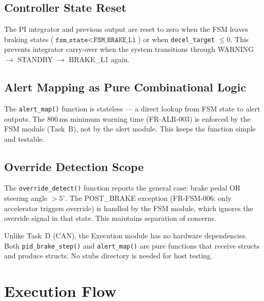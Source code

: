 \documentclass[12pt]{article}
\begin{document}
\subsection{Controller State Reset}

The PI integrator and previous output are reset to zero when the FSM leaves braking states ($\texttt{fsm\_state} < \texttt{FSM\_BRAKE\_L1}$) or when \texttt{decel\_target} $\leq 0$. This prevents integrator carry-over when the system transitions through WARNING $\to$ STANDBY $\to$ BRAKE\_L1 again.

\subsection{Alert Mapping as Pure Combinational Logic}

The \texttt{alert\_map()} function is stateless --- a direct lookup from FSM state to alert outputs. The 800\,ms minimum warning time (FR-ALR-003) is enforced by the FSM module (Task~B), not by the alert module. This keeps the function simple and testable.

\subsection{Override Detection Scope}

The \texttt{override\_detect()} function reports the general case: brake pedal OR steering angle $> 5^{\circ}$. The POST\_BRAKE exception (FR-FSM-006: only accelerator triggers override) is handled by the FSM module, which ignores the override signal in that state. This maintains separation of concerns.

\begin{tcolorbox}[colback=ddbrownlight, colframe=ddbrown, title=\textbf{Design Decision: No HAL abstraction needed}]
Unlike Task~D (CAN), the Execution module has no hardware dependencies. Both \texttt{pid\_brake\_step()} and \texttt{alert\_map()} are pure functions that receive structs and produce structs. No stubs directory is needed for host testing.
\end{tcolorbox}

\section{Execution Flow}
\end{document}
